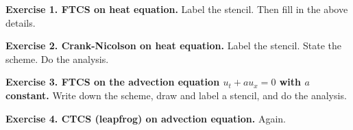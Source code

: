 \documentclass[11pt]{amsart}
\newcommand{\prob}[1]{\bigskip\noindent\textbf{#1.}\quad }
\begin{document}
\bigskip
\prob{Exercise 1. FTCS on heat equation}  Label the stencil.  Then fill in the above details.

\bigskip
\hfill 
\vfill


\clearpage
\newpage
\prob{Exercise 2. Crank-Nicolson on heat equation}  Label the stencil.  State the scheme.  Do the analysis.

\bigskip
\hfill 
\vfill

\prob{Exercise 3. FTCS on the advection equation $u_t + a u_x = 0$ with $a$ constant}  Write down the scheme, draw and label a stencil, and do the analysis.
\vfill

\prob{Exercise 4. CTCS (leapfrog) on advection equation}  Again.
\vfill
\end{document}
